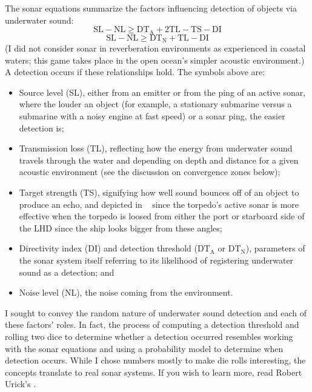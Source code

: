 \documentclass[../TacSubGameRules.tex]{subfiles}
\begin{document}
The sonar equations summarize the factors influencing detection of objects via underwater sound:
\begin{equation}
    \tag{Active}
    \text{SL} - \text{NL}\ge \text{DT}_{\text{A}} +2\text{TL}-\text{TS} - \text{DI}
\end{equation}
\begin{equation}
    \tag{Passive}
    \text{SL} -  \text{NL}\ge\text{DT}_{\text{N}} + \text{TL}-\text{DI}  
\end{equation}
(I did not consider sonar in reverberation environments as experienced in coastal waters; this game takes place in the open ocean's simpler acoustic environment.)
A detection occurs if these relationships hold. The symbols above are:
\begin{itemize}
    \item Source level (SL), either from an emitter or from the ping of an active sonar, where the louder an object (for example, a stationary submarine versus a submarine with a noisy engine at fast speed) or a sonar ping, the easier detection is;
    \item Transmission loss (TL), reflecting how the energy from underwater sound travels through the water and depending on depth and distance for a given acoustic environment (see the discussion on convergence zones below);
    \item Target strength (TS), signifying how well sound bounces off of an object to produce an echo, and depicted in \gametitle~ since the torpedo's active sonar is more effective when the torpedo is loosed from either the port or starboard side of the LHD since the ship looks bigger from these angles;
    \item Directivity index (DI) and detection threshold ($\text{DT}_{{\text{A}}}$ or $\text{DT}_{\text{N}}$), parameters of the sonar system itself referring to its likelihood of registering underwater sound as a detection; and
    \item Noise level (NL), the noise coming from the environment.
\end{itemize}
I sought to convey the random nature of underwater sound detection and each of these factors' roles.
In fact, the process of computing a detection threshold and rolling two dice to determine whether a detection occurred resembles working with the sonar equations and using a probability model to determine when detection occurs.
While I chose numbers mostly to make die rolls interesting, the concepts translate to real sonar systems.
If you wish to learn more, read Robert Urick's .
\end{document}
